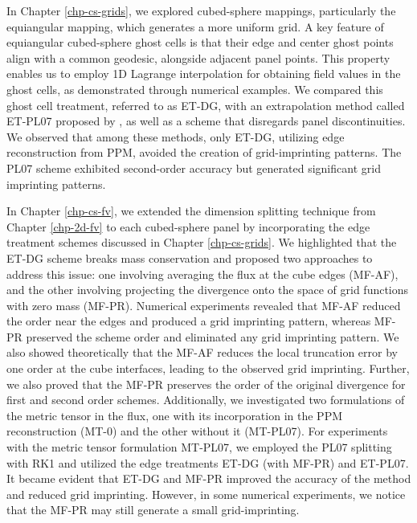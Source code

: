 In Chapter \ref{chp-cs-grids}, we explored cubed-sphere mappings, particularly the equiangular mapping, which generates a more uniform grid.
A key feature of equiangular cubed-sphere ghost cells is that their edge and center ghost points align with a common geodesic, alongside adjacent panel points.
This property enables us to employ 1D Lagrange interpolation for obtaining field values in the ghost cells, as demonstrated through numerical examples.
We compared this ghost cell treatment, referred to as ET-DG, with an extrapolation method called ET-PL07 proposed by \citet{putman:2007},
as well as a scheme that disregards panel discontinuities.
We observed that among these methods, only ET-DG, utilizing edge reconstruction from PPM, avoided the creation of grid-imprinting patterns.
The PL07 scheme exhibited second-order accuracy but generated significant grid imprinting patterns.

In Chapter \ref{chp-cs-fv}, we extended the dimension splitting technique from Chapter \ref{chp-2d-fv} 
to each cubed-sphere panel by incorporating the edge treatment schemes discussed in Chapter \ref{chp-cs-grids}.
We highlighted that the ET-DG scheme breaks mass conservation and proposed two approaches to address this issue:
one involving averaging the flux at the cube edges (MF-AF), and the other involving projecting the divergence
onto the space of grid functions with zero mass (MF-PR).
Numerical experiments revealed that MF-AF reduced the order near the edges and produced a grid imprinting pattern,
whereas MF-PR preserved the scheme order and eliminated any grid imprinting pattern.
We also showed theoretically that the MF-AF reduces the local truncation error by one order at the cube interfaces, leading to the observed grid imprinting.
Further, we also proved that the MF-PR preserves the order of the original divergence for first and second order schemes.
Additionally, we investigated two formulations of the metric tensor in the flux, one with its incorporation in the PPM reconstruction (MT-0) and the other without it (MT-PL07).
For experiments with the metric tensor formulation MT-PL07, we employed the PL07 splitting with RK1 and utilized the edge treatments ET-DG (with MF-PR)  and ET-PL07.
It became evident that ET-DG and MF-PR improved the accuracy of the method and reduced grid imprinting.
However, in some numerical experiments, we notice that the MF-PR may still generate a small grid-imprinting.

\newpage
